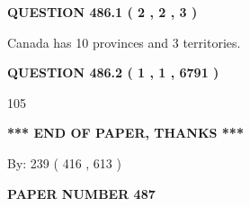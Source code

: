 \documentclass[12pt]{article}
\begin{document}
   
   
   
 \vspace{0.2in}
 
 
 
 
   
   
  
\vspace{0.2in}
  
{\textbf{\Large{QUESTION
486.1 
 ( 2 , 2 , 3 )
}}}
  
  
 
 
\noindent{}
 
 
Canada has 10  provinces and 3 territories.
 
 
 
 
  
\vspace{0.2in}
  
{\textbf{\Large{QUESTION
486.2 
 ( 1 , 1 , 6791 )
}}}
  
  
 
 
\noindent{}

105
 
 
   
   
 \vspace{0.2in}
 
   
   
   
   
\vspace{1.0in} 
{\textbf{\large{ *** END OF PAPER, THANKS *** }}} 
   
   
\hspace{1.0in} By: 
 239 ( 416 ,  613 )
   
   
   
   
\newpage 
\setcounter{page}{ 
   487001 } 
   
   
   
   
 {\textbf{ \Large{ PAPER NUMBER  487  }}}
   
   
\vspace{0.2in}
   
   
   
   
   
   
 \vspace{0.2in}
 
 
 
 
   
\end{document}

